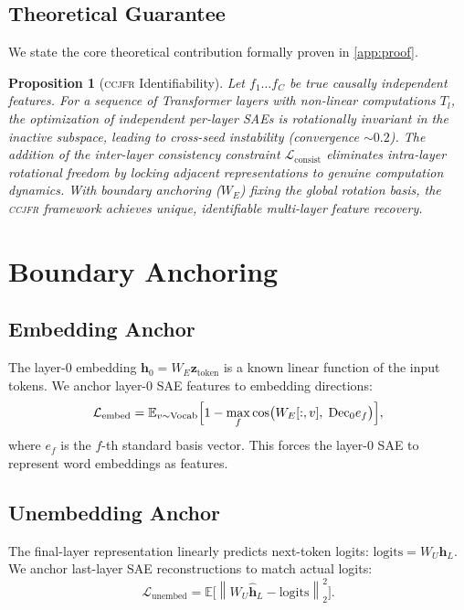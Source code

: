 \documentclass[12pt,a4paper]{article}
\newtheorem{proposition}[theorem]{Proposition}
\newcommand{\EE}{\mathbb{E}}
\newcommand{\norm}[1]{\left\|#1\right\|}
\newcommand{\calL}{\mathcal{L}}
\newcommand{\bz}{\mathbf{z}}
\newcommand{\bh}{\mathbf{h}}
\newcommand{\Dec}{\mathrm{Dec}}
\newcommand{\CCJFR}{\textsc{ccjfr}}
\begin{document}
\subsection{Theoretical Guarantee}

We state the core theoretical contribution formally proven in \cref{app:proof}.

\begin{proposition}[\CCJFR{} Identifiability]
Let $f_1 \dots f_C$ be true causally independent features. For a sequence of Transformer layers with non-linear computations $T_l$, the optimization of independent per-layer SAEs is rotationally invariant in the inactive subspace, leading to cross-seed instability (convergence $\sim0.2$). The addition of the inter-layer consistency constraint $\calL_{\mathrm{consist}}$ eliminates intra-layer rotational freedom by locking adjacent representations to genuine computation dynamics. With boundary anchoring ($W_E$) fixing the global rotation basis, the \CCJFR{} framework achieves unique, identifiable multi-layer feature recovery.
\end{proposition}

\section{Boundary Anchoring}
\label{sec:anchoring}

\subsection{Embedding Anchor}

The layer-0 embedding $\bh_0 = W_E \bz_{\mathrm{token}}$ is a known linear
function of the input tokens. We anchor layer-0 SAE features to embedding
directions:
\[
  \calL_{\mathrm{embed}} = \EE_{v \sim \mathrm{Vocab}}
    \Bigl[1 - \max_{f} \cos\bigl(W_E[:,v],\; \Dec_0 e_f\bigr)\Bigr],
\]
where $e_f$ is the $f$-th standard basis vector.
This forces the layer-0 SAE to represent word embeddings as features.

\subsection{Unembedding Anchor}

The final-layer representation linearly predicts next-token logits:
$\mathrm{logits} = W_U \bh_L$.
We anchor last-layer SAE reconstructions to match actual logits:
\[
  \calL_{\mathrm{unembed}} = \EE\bigl[\norm{W_U \hat{\bh}_L - \mathrm{logits}}_2^2\bigr].
\]
\end{document}
